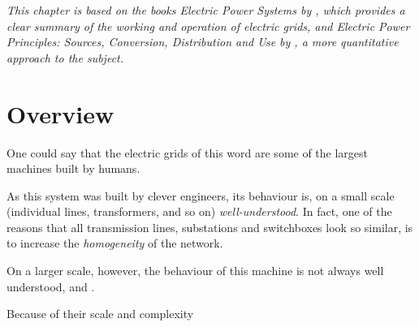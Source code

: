 \documentclass[main.tex]{subfiles}
\begin{document}





\emph{This chapter is based on the books \emph{Electric Power Systems} by \cite{VonMeier2006}, which provides a clear summary of the working and operation of electric grids, and \emph{Electric Power Principles: Sources, Conversion, Distribution and Use} by \cite{Kirtley2010}, a more quantitative approach to the subject.}
\section{Overview}
One could say that the electric grids of this word are some of the largest machines built by humans. 

As this system was built by clever engineers, its behaviour is, on a small scale (individual lines, transformers, and so on) \emph{well-understood}. In fact, one of the reasons that all transmission lines, substations and switchboxes look so similar, is to increase the \emph{homogeneity} of the network.

On a larger scale, however, the behaviour of this machine is not always well understood, and .

Because of their scale and complexity

\end{document}

